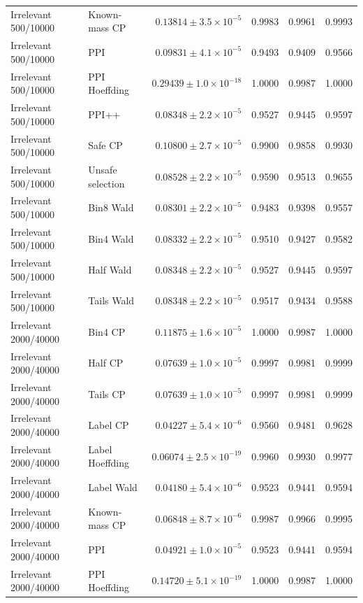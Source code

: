 \begin{longtable}{llrrrr}
Irrelevant 500/10000 & Known-mass CP & $0.13814\pm 3.5\times 10^{-5}$ & 0.9983 & 0.9961 & 0.9993 \\
Irrelevant 500/10000 & PPI & $0.09831\pm 4.1\times 10^{-5}$ & 0.9493 & 0.9409 & 0.9566 \\
Irrelevant 500/10000 & PPI Hoeffding & $0.29439\pm 1.0\times 10^{-18}$ & 1.0000 & 0.9987 & 1.0000 \\
Irrelevant 500/10000 & PPI++ & $0.08348\pm 2.2\times 10^{-5}$ & 0.9527 & 0.9445 & 0.9597 \\
Irrelevant 500/10000 & Safe CP & $0.10800\pm 2.7\times 10^{-5}$ & 0.9900 & 0.9858 & 0.9930 \\
Irrelevant 500/10000 & Unsafe selection & $0.08528\pm 2.2\times 10^{-5}$ & 0.9590 & 0.9513 & 0.9655 \\
Irrelevant 500/10000 & Bin8 Wald & $0.08301\pm 2.2\times 10^{-5}$ & 0.9483 & 0.9398 & 0.9557 \\
Irrelevant 500/10000 & Bin4 Wald & $0.08332\pm 2.2\times 10^{-5}$ & 0.9510 & 0.9427 & 0.9582 \\
Irrelevant 500/10000 & Half Wald & $0.08348\pm 2.2\times 10^{-5}$ & 0.9527 & 0.9445 & 0.9597 \\
Irrelevant 500/10000 & Tails Wald & $0.08348\pm 2.2\times 10^{-5}$ & 0.9517 & 0.9434 & 0.9588 \\
Irrelevant 2000/40000 & Bin4 CP & $0.11875\pm 1.6\times 10^{-5}$ & 1.0000 & 0.9987 & 1.0000 \\
Irrelevant 2000/40000 & Half CP & $0.07639\pm 1.0\times 10^{-5}$ & 0.9997 & 0.9981 & 0.9999 \\
Irrelevant 2000/40000 & Tails CP & $0.07639\pm 1.0\times 10^{-5}$ & 0.9997 & 0.9981 & 0.9999 \\
Irrelevant 2000/40000 & Label CP & $0.04227\pm 5.4\times 10^{-6}$ & 0.9560 & 0.9481 & 0.9628 \\
Irrelevant 2000/40000 & Label Hoeffding & $0.06074\pm 2.5\times 10^{-19}$ & 0.9960 & 0.9930 & 0.9977 \\
Irrelevant 2000/40000 & Label Wald & $0.04180\pm 5.4\times 10^{-6}$ & 0.9523 & 0.9441 & 0.9594 \\
Irrelevant 2000/40000 & Known-mass CP & $0.06848\pm 8.7\times 10^{-6}$ & 0.9987 & 0.9966 & 0.9995 \\
Irrelevant 2000/40000 & PPI & $0.04921\pm 1.0\times 10^{-5}$ & 0.9523 & 0.9441 & 0.9594 \\
Irrelevant 2000/40000 & PPI Hoeffding & $0.14720\pm 5.1\times 10^{-19}$ & 1.0000 & 0.9987 & 1.0000 \\

\end{longtable}
